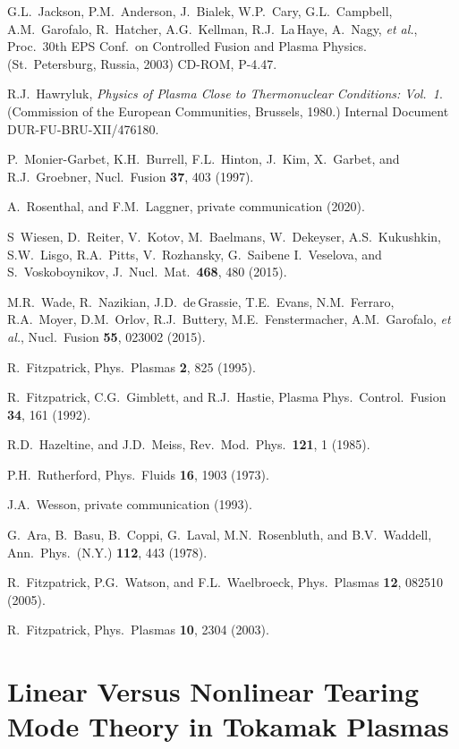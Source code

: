 \documentclass[12pt,prb,aps]{revtex4-1}
\begin{document}
\begin{thebibliography}{99}
 G.L.~Jackson, P.M.~Anderson, J.~Bialek, W.P.~Cary, G.L.~Campbell, A.M.~Garofalo,  R.~Hatcher, A.G.~Kellman, R.J.~La\,Haye, A.~Nagy, {\em et al.},  
Proc.\ 30th EPS Conf.\ on Controlled Fusion and Plasma Physics. (St.\ Petersburg, Russia, 2003) CD-ROM, P-4.47.

 R.J.~Hawryluk, {\em Physics of Plasma Close to Thermonuclear Conditions: Vol.~1}. (Commission of the European Communities, Brussels, 1980.) 
Internal Document DUR-FU-BRU-XII/476180.

 P.~Monier-Garbet, K.H.~Burrell, F.L.~Hinton, J.~Kim, X.~Garbet, and R.J.~Groebner,   
Nucl.\ Fusion  {\bf 37}, 403 (1997).

 A.~Rosenthal, and F.M.~Laggner, private communication (2020).

 S~Wiesen, D.~Reiter, V.~Kotov, M.~Baelmans, W.~Dekeyser, A.S.~Kukushkin, S.W.~Lisgo, R.A.~Pitts, V.~Rozhansky, G.~Saibene I.~Veselova, and S.~Voskoboynikov,
J.\ Nucl.\ Mat.\ {\bf 468}, 480 (2015).

 M.R.~Wade, R.~Nazikian, J.D.~de\,Grassie, T.E.~Evans, N.M.~Ferraro, R.A.~Moyer, D.M.~Orlov, 
R.J.~Buttery, M.E.~Fenstermacher, A.M.~Garofalo, {\em et al.}, Nucl.\ Fusion {\bf 55}, 023002 (2015). 

 R.~Fitzpatrick,  Phys.\ Plasmas {\bf 2}, 825 (1995).

 R.~Fitzpatrick, C.G.~Gimblett, and R.J.~Hastie, 
Plasma Phys.\ Control.\ Fusion {\bf 34}, 161 (1992).

 R.D.~Hazeltine, and J.D.~Meiss, Rev.\ Mod.\ Phys.\ {\bf 121}, 1 (1985).

 P.H.~Rutherford,  Phys.\ Fluids  {\bf 16}, 1903 (1973).

 J.A.~Wesson, private communication (1993).

 G.~Ara,  B.~Basu, B.~Coppi, G.~Laval, M.N.~Rosenbluth, and B.V.~Waddell, Ann.\ Phys.\ (N.Y.) {\bf 112}, 443 (1978). 

 R.~Fitzpatrick, P.G.~Watson, and F.L.~Waelbroeck, Phys.\ Plasmas {\bf 12}, 082510 (2005).

 R.~Fitzpatrick, Phys.\ Plasmas {\bf 10}, 2304 (2003).

\end{thebibliography}

\appendix
\section{Linear Versus Nonlinear Tearing Mode Theory in Tokamak Plasmas}\label{appa}
\end{document}
